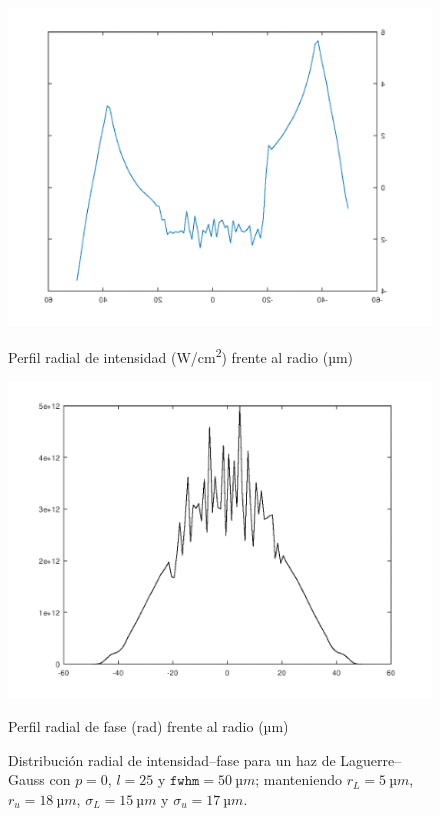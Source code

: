 \begin{figure}[htbp]
  \centering
  \begin{subcaptionblock}{.4\textwidth}
    \centering
    \includegraphics[width=\textwidth]{Figuras/anx_oamfs_8.png}
    \caption*{Perfil radial de intensidad (\unit{W/cm^2}) frente al radio (\unit{µm})}
  \end{subcaptionblock}
  \begin{subcaptionblock}{.4\textwidth}
    \centering
    \includegraphics[width=\textwidth]{Figuras/anx_oamint_8.png}
    \caption*{Perfil radial de fase (\unit{rad}) frente al radio (\unit{µm})}
  \end{subcaptionblock}
   \caption*{Distribución radial de intensidad--fase para un haz de Laguerre--Gauss con $p=0$, $l=25$ y $\texttt{fwhm}=\qty{50}{µm}$; manteniendo $r_{L}=\qty{5}{µm}$, $r_{u}=\qty{18}{µm}$, $\sigma_{L}=\qty{15}{µm}$ y $\sigma_{u}=\qty{17}{µm}$.}
\end{figure}

